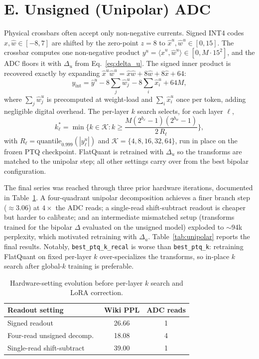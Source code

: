 \documentclass[letterpaper]{article} %
\theoremstyle{plain}
\begin{document}
\section{E. Unsigned (Unipolar) ADC}

Physical crossbars often accept only non-negative currents. Signed INT4 codes $\hat{x},\hat{w}\in[-8,7]$ are shifted by the zero-point $z = 8$ to $\hat{x}^u,\hat{w}^u\in[0,15]$. The crossbar computes one non-negative product $y^u = \langle \hat{x}^u, \hat{w}^u\rangle \in [0, M\cdot 15^2]$, and the ADC floors it with $\Delta_u$ from Eq.~\eqref{eq:delta_u}. The signed inner product is recovered exactly by expanding $\hat{x}^u\hat{w}^u = \hat{x}\hat{w} + 8\hat{w} + 8\hat{x} + 64$:
\begin{equation}
    y_{\mathrm{int}} = \hat{y}^u - 8\!\sum_j \hat{w}^u_j - 8\!\sum_i \hat{x}^u_i + 64M,
\end{equation}
where $\sum_j \hat{w}^u_j$ is precomputed at weight-load and $\sum_i \hat{x}^u_i$ once per token, adding negligible digital overhead. The per-layer $k$ search selects, for each layer $\ell$,
\begin{equation}
    k^*_\ell = \min\!\Big\{ k \in \mathcal{K} : k \ge \frac{M(2^{b_x}-1)(2^{b_w}-1)}{2\,R_\ell} \Big\},
\end{equation}
with $R_\ell = \mathrm{quantile}_{0.999}(|y^u_\ell|)$ and $\mathcal{K} = \{4,8,16,32,64\}$, run in place on the frozen PTQ checkpoint. FlatQuant is retrained with $\Delta_u$ so the transforms are matched to the unipolar step; all other settings carry over from the best bipolar configuration.

The final series was reached through three prior hardware iterations, documented in Table~\ref{tab:readout_evolution}. A four-quadrant unipolar decomposition achieves a finer branch step ($\approx 3.06$) at $4\times$ the ADC reads; a single-read shift-subtract readout is cheaper but harder to calibrate; and an intermediate mismatched setup (transforms trained for the bipolar $\Delta$ evaluated on the unsigned model) exploded to $\sim$94k perplexity, which motivated retraining with $\Delta_u$. Table~\ref{tab:unipolar} reports the final results. Notably, \texttt{best\_ptq\_k\_recal} is worse than \texttt{best\_ptq\_k}: retraining FlatQuant on fixed per-layer $k$ over-specializes the transforms, so in-place $k$ search after global-$k$ training is preferable.

\begin{table}[htbp]
\centering
\setlength{\tabcolsep}{4pt}
\begin{tabular}{@{}lcc@{}}
\toprule
\textbf{Readout setting} & \textbf{Wiki PPL} & \textbf{ADC reads} \\
\midrule
Signed readout               & 26.66 & 1 \\
Four-read unsigned decomp.\  & 18.08 & 4 \\
Single-read shift-subtract   & 39.00 & 1 \\
\bottomrule
\end{tabular}
\caption{Hardware-setting evolution before per-layer $k$ search and LoRA correction.}
\label{tab:readout_evolution}
\end{table}
\end{document}
